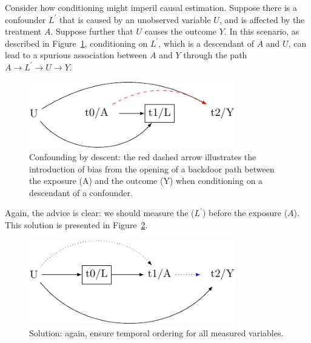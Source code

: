 \documentclass[
  singlecolumn]{report}
\begin{document}
Consider how conditioning might imperil causal estimation. Suppose there
is a confounder \(L^\prime\) that is caused by an unobserved variable
\(U\), and is affected by the treatment \(A\). Suppose further that
\(U\) causes the outcome \(Y\). In this scenario, as described in
Figure~\ref{fig-dag-descendent}, conditioning on \(L^\prime\), which is
a descendant of \(A\) and \(U\), can lead to a spurious association
between \(A\) and \(Y\) through the path \(A \to L^\prime \to U \to Y\).

\begin{figure}

{\centering \includegraphics[width=0.8\textwidth,height=\textheight]{causal-dags_files/figure-pdf/fig-dag-descendent-1.pdf}

}

\caption{\label{fig-dag-descendent}Confounding by descent: the red
dashed arrow illustrates the introduction of bias from the opening of a
backdoor path between the exposure (A) and the outcome (Y) when
conditioning on a descendant of a confounder.}

\end{figure}

Again, the advice is clear: we should measure the (\(L^\prime\)) before
the exposure (\(A\)). This solution is presented in
Figure~\ref{fig-dag-descendent-solution}.

\begin{figure}

{\centering \includegraphics[width=0.8\textwidth,height=\textheight]{causal-dags_files/figure-pdf/fig-dag-descendent-solution-1.pdf}

}

\caption{\label{fig-dag-descendent-solution}Solution: again, ensure
temporal ordering for all measured variables.}

\end{figure}
\end{document}
